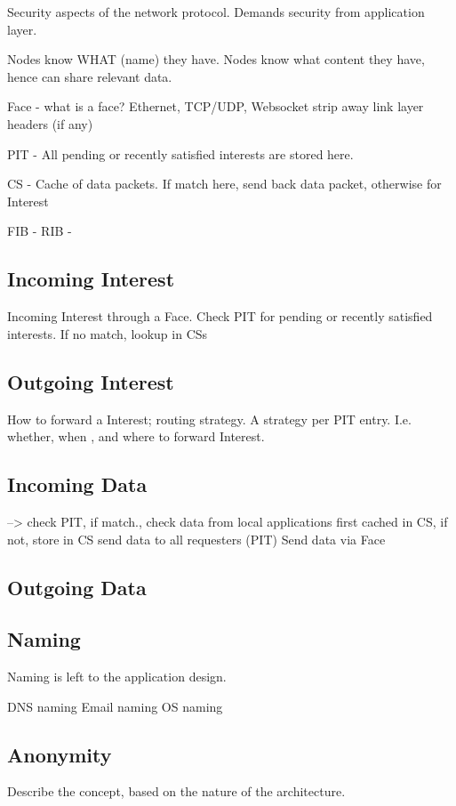 Security aspects of the network protocol. 
Demands security from application layer.

Nodes know WHAT (name) they have. 
Nodes know what content they have, hence can share relevant data.

Face - what is a face? Ethernet, TCP/UDP, Websocket
strip away link layer headers (if any)

\gls{PIT} - All pending or recently satisfied interests are stored here.


\gls{CS} - Cache of data packets. If match here, send back data packet, otherwise for Interest

\gls{FIB} - 
\gls{RIB} - 
 
\subsection{Incoming Interest}
Incoming Interest through a Face. Check \gls{PIT} for pending or recently satisfied interests. If no match, lookup in \gls{CS}s

\subsection{Outgoing Interest}
How to forward a Interest; routing strategy. A strategy per \gls{PIT} entry. I.e. whether, when , and where to forward Interest.

\subsection{Incoming Data}
--> check \gls{PIT}, if match., check data from local applications first cached in \gls{CS}, if not, store in \gls{CS} send data to all requesters (\gls{PIT})
Send data via Face

\subsection{Outgoing Data}


\subsection{Naming}
Naming is left to the application design.

\gls{DNS} naming
Email naming
\gls{OS} naming

\subsection{Anonymity}
Describe the concept, based on the nature of the architecture.


